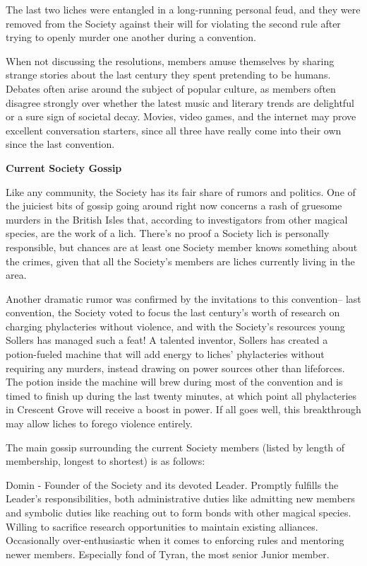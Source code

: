 \documentclass[blue]{Sel}
\begin{document}
The last two liches were entangled in a long-running personal feud, and they were removed from the Society against their will for violating the second rule after trying to openly murder one another during a convention.

When not discussing the resolutions, members amuse themselves by sharing strange stories about the last century they spent pretending to be humans. Debates often arise around the subject of popular culture, as members often disagree strongly over whether the latest music and literary trends are delightful or a sure sign of societal decay. Movies, video games, and the internet may prove excellent conversation starters, since all three have really come into their own since the last convention.

\textbf{Current Society Gossip}

Like any community, the Society has its fair share of rumors and politics. One of the juiciest bits of gossip going around right now concerns a rash of gruesome murders in the British Isles that, according to investigators from other magical species, are the work of a lich. There's no proof a Society lich is personally responsible, but chances are at least one Society member knows something about the crimes, given that all the Society's members are liches currently living in the area.

Another dramatic rumor was confirmed by the invitations to this convention-- last convention, the Society voted to focus the last century's worth of research on charging phylacteries without violence, and with the Society's resources young Sollers has managed such a feat! A talented inventor, Sollers has created a potion-fueled machine that will add energy to liches' phylacteries without requiring any murders, instead drawing on power sources other than lifeforces. The potion inside the machine will brew during most of the convention and is timed to finish up during the last twenty minutes, at which point all phylacteries in Crescent Grove will receive a boost in power. If all goes well, this breakthrough may allow liches to forego violence entirely.

The main gossip surrounding the current Society members (listed by length of membership, longest to shortest) is as follows:

Domin - Founder of the Society and its devoted Leader. Promptly fulfills the Leader's responsibilities, both administrative duties like admitting new members and symbolic duties like reaching out to form bonds with other magical species. Willing to sacrifice research opportunities to maintain existing alliances. Occasionally over-enthusiastic when it comes to enforcing rules and mentoring newer members. Especially fond of Tyran, the most senior Junior member.
\end{document}
